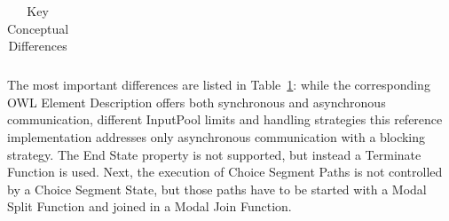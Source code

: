 \begin{table}[htbp]
\begin{tabular}[t]{@{}p{0.23\linewidth} p{0.35\linewidth} p{0.35\linewidth} @{}}
        \bottomrule
    \end{tabular}
    \caption{Key Conceptual Differences}
    \label{tbl:asm:concepts_1}
\end{table}

The most important differences are listed in Table~\ref{tbl:asm:concepts_1}:
while the corresponding OWL Element Description offers both synchronous and asynchronous communication, different InputPool limits and handling strategies
this reference implementation addresses only asynchronous communication with a blocking strategy.
The End State property is not supported, but instead a Terminate Function is used.
Next, the execution of Choice Segment Paths is not controlled by a Choice Segment State, but those paths have to be started with a Modal Split Function and joined in a Modal Join Function.

